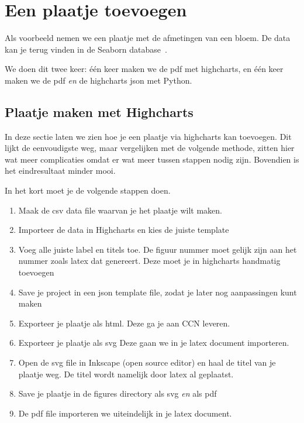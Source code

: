 \section{Een plaatje toevoegen}
\label{sec:plaatje_toevoegen}

Als voorbeeld nemen we een plaatje met de afmetingen van een bloem.
De data kan je terug vinden in de Seaborn database~\citep{Waskom2021}.

We doen dit twee keer:  één keer maken we de pdf met highcharts, en één keer maken we de pdf
\emph{en} de highcharts json met Python.

\subsection{Plaatje maken met Highcharts}
\label{subsec:plaatje_highcharts}

In deze sectie laten we zien hoe je een plaatje via highcharts kan toevoegen.
Dit lijkt de eenvoudigste weg, maar vergelijken met de volgende methode, zitten hier wat meer
complicaties omdat er wat meer tussen stappen nodig zijn.
Bovendien is het eindresultaat minder mooi.

In het kort moet je de volgende stappen doen.

\begin{enumerate}
    \item Maak de csv data file waarvan je het plaatje wilt maken.
    \item Importeer de data in Highcharts en kies de juiste template
    \item Voeg alle juiste label en titels toe.
    De figuur nummer moet gelijk zijn aan het nummer zoals latex dat genereert.
    Deze moet je in highcharts handmatig toevoegen
    \item Save je project  in een json template file, zodat je later nog aanpassingen kunt maken
    \item Exporteer je plaatje als html.
    Deze ga je aan CCN leveren.
    \item Exporteer je plaatje als svg
    Deze gaan we in je latex document importeren.
    \item Open de svg file in Inkscape (open source editor) en haal de titel van je plaatje weg.
    De titel wordt namelijk door latex al geplaatst.
    \item Save je plaatje in de figures directory als svg \emph{en} als pdf
    \item De pdf file importeren we uiteindelijk in je latex document.
\end{enumerate}

